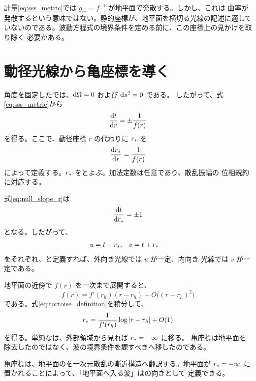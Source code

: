 計量\eqref{eq:sss_metric}では $g_{rr}=f^{-1}$ が地平面で発散する。しかし、これは
曲率が発散するという意味ではない。静的座標が、地平面を横切る光線の記述に適して
いないのである。波動方程式の境界条件を定める前に、この座標上の見かけを取り除く
必要がある。

\section{動径光線から亀座標を導く}

角度を固定したでは、$\mathrm{d}\Omega=0$ および $\mathrm{d} s^2=0$ である。
したがって、式\eqref{eq:sss_metric}から
\begin{equation}
\frac{\mathrm{d} t}{\mathrm{d} r}
=
\mathord{\pm}\frac{1}{f(r)}
\label{eq:null_slope_r}
\end{equation}
を得る。ここで、動径座標 $r$ の代わりに $r_*$ を
\begin{equation}
\frac{\mathrm{d} r_*}{\mathrm{d} r}
=
\frac{1}{f(r)}
\label{eq:tortoise_definition}
\end{equation}
によって定義する。$r_*$ をとよぶ。加法定数は任意であり、散乱振幅の
位相規約に対応する。

式\eqref{eq:null_slope_r}は
\begin{equation}
\frac{\mathrm{d} t}{\mathrm{d} r_*}
=
\mathord{\pm}1
\end{equation}
となる。したがって、
\begin{align}
u&=t-r_* ,
&
v&=t+r_*
\label{eq:null_coordinates}
\end{align}
をそれぞれ、と定義すれば、外向き光線では $u$ が一定、内向き
光線では $v$ が一定である。

地平面の近傍で $f(r)$ を一次まで展開すると、
\begin{equation}
f(r)
=
f'(r_h)(r-r_h)
+O\bigl((r-r_h)^2\bigr)
\end{equation}
である。式\eqref{eq:tortoise_definition}を積分して、
\begin{equation}
r_*
=
\frac{1}{f'(r_h)}
\log|r-r_h|
+O(1)
\label{eq:tortoise_near_horizon}
\end{equation}
を得る。単純なは、外部領域から見れば $r_*=-\infty$ に移る。
亀座標は地平面を除去したのではなく、波の境界条件を課すべきへ移したのである。

\begin{principlebox}
亀座標は、地平面のを一次元散乱の漸近構造へ翻訳する。地平面が
$r_*=-\infty$ に置かれることによって、「地平面へ入る波」はの向きとして
定義できる。
\end{principlebox}

